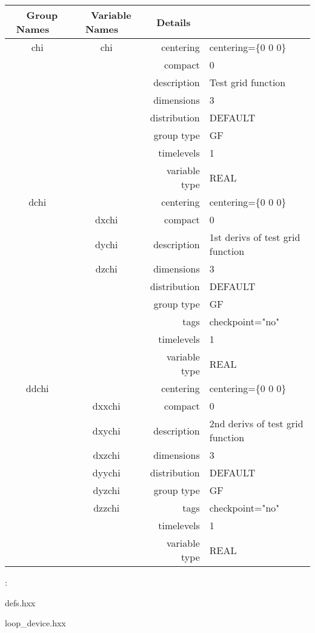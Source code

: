 \begin{tabular*}{150mm}{|c|c@{\extracolsep{\fill}}|rl|} \hline 
~ {\bf Group Names} ~ & ~ {\bf Variable Names} ~  &{\bf Details} ~ & ~\\ 
\hline 
chi & chi & centering & centering=\{0 0 0\} \\ 
 &  & compact & 0 \\ 
 &  & description & Test grid function \\ 
 &  & dimensions & 3 \\ 
 &  & distribution & DEFAULT \\ 
 &  & group type & GF \\ 
 &  & timelevels & 1 \\ 
 &  & variable type & REAL \\ 
\hline 
dchi &  & centering & centering=\{0 0 0\} \\ 
 & dxchi & compact & 0 \\ 
 & dychi & description & 1st derivs of test grid function \\ 
 & dzchi & dimensions & 3 \\ 
 &  & distribution & DEFAULT \\ 
 &  & group type & GF \\ 
 &  & tags & checkpoint="no" \\ 
 &  & timelevels & 1 \\ 
 &  & variable type & REAL \\ 
\hline 
ddchi &  & centering & centering=\{0 0 0\} \\ 
 & dxxchi & compact & 0 \\ 
 & dxychi & description & 2nd derivs of test grid function \\ 
 & dxzchi & dimensions & 3 \\ 
 & dyychi & distribution & DEFAULT \\ 
 & dyzchi & group type & GF \\ 
 & dzzchi & tags & checkpoint="no" \\ 
 &  & timelevels & 1 \\ 
 &  & variable type & REAL \\ 
\hline 
\end{tabular*} 



\vspace{5mm}

: 

defs.hxx

loop\_device.hxx

